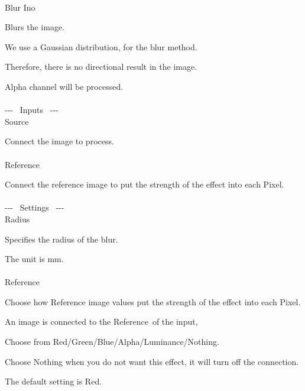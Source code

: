 \documentclass[a4paper,12pt]{article}
\begin{document}
\thispagestyle{empty}

\Large
\noindent \\
Blur Ino\medskip
\par
\normalsize
Blurs the image.\\
\par
We use a Gaussian distribution, for the blur method.\par
Therefore, there is no directional result in the image.\\
\par
Alpha channel will be processed.\\
\\
-{-}- \ Inputs \ -{-}-\\
Source\par
Connect the image to process.\\
\\
Reference\par
Connect the reference image to put the strength of the effect into each Pixel.\\
\\
-{-}- \ Settings \ -{-}-\\
Radius\par
Specifies the radius of the blur.\par
The unit is mm.\\
\\
Reference\par
Choose how Reference image values put the strength of the effect into each Pixel.\par
An image is connected to the \textquotedbl Reference\textquotedbl \ of the input,\par
Choose from Red/Green/Blue/Alpha/Luminance/Nothing.\par
Choose Nothing when you do not want this effect, it will turn off the connection.\par
The default setting is Red.
\end{document}
